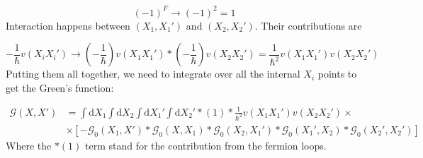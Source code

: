 \begin{equation} \label{eq:36}
\left( -1 \right)^{F} \to \left( -1 \right)^{2} = 1
\end{equation}
Interaction happens between $\left( X_{1}, X_{1}' \right)$ and $\left( X_{2}, X_{2}' \right)$. Their contributions are

\begin{equation} \label{eq:37}
- \frac{1}{\hbar} v \left( X_{i} X_{i}' \right)
\to
\left( - \frac{1}{\hbar} \right) v \left( X_{1} X_{1}' \right)
*
\left( - \frac{1}{\hbar} \right) v \left( X_{2} X_{2}' \right)
=
\frac{1}{\hbar^{2}} v \left( X_{1} X_{1}' \right) v \left( X_{2} X_{2}' \right)
\end{equation}
Putting them all together, we need to integrate over all the internal $X_{i}$ points to get the Green's function:

\begin{align} \label{eq:38}
\mathcal{G} \left( X, X' \right)
&=
\int \text{d}X_{1} \int \text{d}X_{2} \int \text{d}X_{1}' \int \text{d}X_{2}'
*
\left( 1 \right)
*
\frac{1}{\hbar^{2}} v \left( X_{1} X_{1}' \right) v \left( X_{2} X_{2}' \right)
\times \nonumber \\
&\times
\left[
- \mathcal{G}_{0} \left( X_{1}, X' \right)
*
\mathcal{G}_{0} \left( X, X_{1} \right)
*
\mathcal{G}_{0} \left( X_{2}, X_{1}' \right)
*
\mathcal{G}_{0} \left( X_{1}', X_{2} \right)
*
\mathcal{G}_{0} \left( X_{2}', X_{2}' \right)
\right]
\end{align}
Where the $* \left( 1 \right)$ term stand for the contribution from the fermion loops.